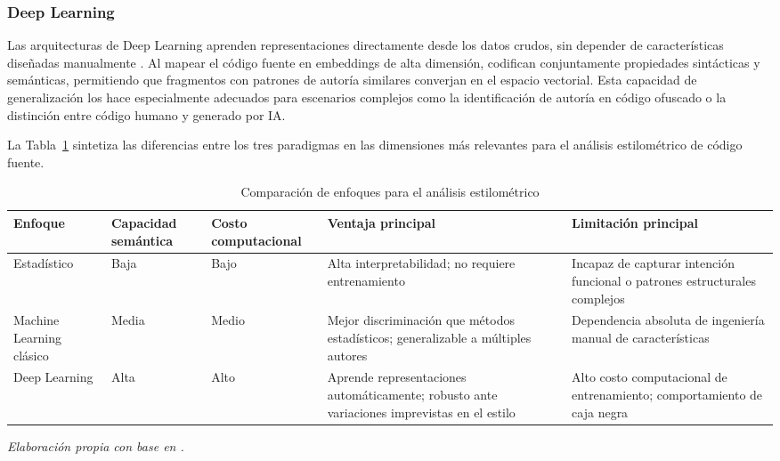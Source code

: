 \subsubsection{Deep Learning}

Las arquitecturas de Deep Learning aprenden representaciones directamente 
desde los datos crudos, sin depender de características diseñadas 
manualmente \cite{Horvath2026ProgrammerAttribution}. Al mapear el código 
fuente en embeddings de alta dimensión, codifican conjuntamente 
propiedades sintácticas y semánticas, permitiendo que fragmentos con 
patrones de autoría similares converjan en el espacio vectorial. Esta 
capacidad de generalización los hace especialmente adecuados para 
escenarios complejos como la identificación de autoría en código ofuscado 
o la distinción entre código humano y generado por IA.

La Tabla~\ref{tab:enfoques_estilo} sintetiza las diferencias entre los 
tres paradigmas en las dimensiones más relevantes para el análisis 
estilométrico de código fuente.

\begin{table}[ht]
\centering
\caption{Comparación de enfoques para el análisis estilométrico}
\label{tab:enfoques_estilo}
\renewcommand{\arraystretch}{1.6}
\begin{tabularx}{\textwidth}{>{\raggedright\arraybackslash}p{2.4cm} >{\raggedright\arraybackslash}p{1.8cm} >{\raggedright\arraybackslash}p{1.8cm} >{\raggedright\arraybackslash}X >{\raggedright\arraybackslash}X}
\toprule
\textbf{Enfoque} & 
\textbf{Capacidad semántica} & 
\textbf{Costo computacional} & 
\textbf{Ventaja principal} & 
\textbf{Limitación principal} \\
\midrule

Estadístico 
& Baja 
& Bajo 
& Alta interpretabilidad; no requiere entrenamiento 
\cite{Horvath2026ProgrammerAttribution}
& Incapaz de capturar intención funcional o patrones 
estructurales complejos \\

\addlinespace

Machine Learning clásico 
& Media 
& Medio 
& Mejor discriminación que métodos estadísticos; 
generalizable a múltiples autores 
\cite{Horvath2026ProgrammerAttribution}
& Dependencia absoluta de ingeniería manual 
de características \\

\addlinespace

Deep Learning 
& Alta 
& Alto 
& Aprende representaciones automáticamente; robusto 
ante variaciones imprevistas en el estilo 
\cite{Horvath2026ProgrammerAttribution}
& Alto costo computacional de entrenamiento; 
comportamiento de caja negra \\

\bottomrule
\end{tabularx}
\smallskip
\footnotesize\textit{Elaboración propia con base en 
\cite{Horvath2026ProgrammerAttribution}.}
\end{table}

